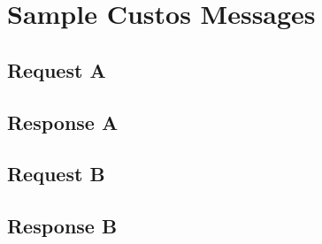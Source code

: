 \chapter{Sample Custos Messages}

\section{Request A}

\section{Response A}

\section{Request B}

\section{Response B}
